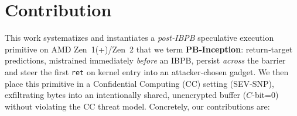 \documentclass[11pt,a4paper]{article}
\begin{document}
\section{Contribution}
\label{sec:contribution}

This work systematizes and instantiates a \emph{post‑IBPB} speculative execution primitive on AMD Zen~1(+)/Zen~2 that we term \textbf{PB‑Inception}: return‑target predictions, mistrained immediately \emph{before} an IBPB, persist \emph{across} the barrier and steer the first \texttt{ret} on kernel entry into an attacker‑chosen gadget. We then place this primitive in a Confidential Computing (CC) setting (SEV‑SNP), exfiltrating bytes into an intentionally shared, unencrypted buffer (\(C\)-bit=0) without violating the CC threat model. Concretely, our contributions are:
\end{document}
